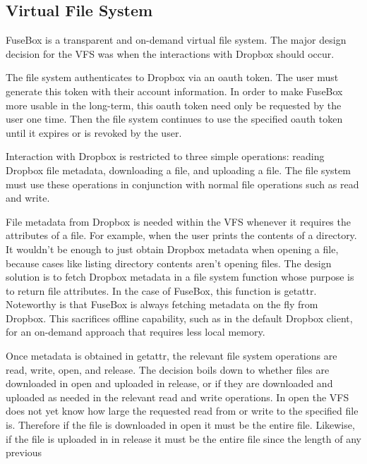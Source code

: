 \documentclass[11pt,twocolumn,letterpaper]{article}
\newcommand{\appname}{FuseBox }
\newcommand{\appnameWOspace}{FuseBox}
\begin{document}
\subsection{Virtual File System}
\label{sec:fs}
\appname is a transparent and on-demand virtual file system. The major design
decision for the VFS was when the interactions with Dropbox should
occur. 
\par The file system authenticates to Dropbox via an oauth token. The user must
generate this token with their account information. In order to make
\appname more usable in the long-term, this oauth token need only be
requested by the user one time. Then the file system continues to
use the specified oauth token until it expires or is
revoked by the user. 
\par Interaction with Dropbox is restricted to three simple
operations: reading Dropbox file metadata, downloading a file, 
and uploading a file. The file system must use these operations in
conjunction with normal file operations such as read and write. 
\par File metadata from Dropbox is needed within the VFS whenever it
requires the attributes of a file. For example, when the user prints
the contents of a directory. It wouldn't be enough to just obtain Dropbox
metadata when opening a file, because cases like listing directory contents
aren't opening files. The design solution is to fetch Dropbox metadata
in a file system function whose purpose is to return file
attributes. In the case of \appnameWOspace, this function is getattr. 
Noteworthy is that \appname is always fetching metadata on the fly
from Dropbox. This sacrifices offline capability, such as in the
default Dropbox client, for an on-demand approach that requires less
local memory. 
\par Once metadata is obtained in getattr, the relevant file system 
operations are read, write, open, and
release. The decision boils down to whether files are downloaded in open and
uploaded in release, or if they are downloaded and uploaded as needed
in the relevant read and write operations.
In open the VFS does not yet know how large the requested read from or
write to the specified file is. Therefore if the file is downloaded in
open it must be the entire file. Likewise, if the file is uploaded in
in release it must be the entire file since the length of any previous
\end{document}
